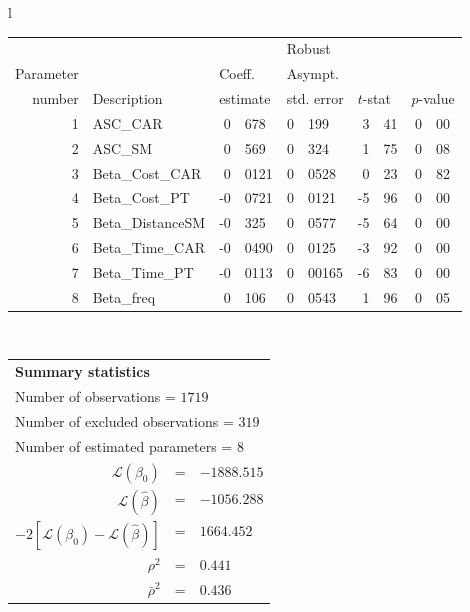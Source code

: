   \begin{tabular}{l}
\begin{tabular}{rlr@{.}lr@{.}lr@{.}lr@{.}l}
         &                       &   \multicolumn{2}{l}{}    & \multicolumn{2}{l}{Robust}  &     \multicolumn{4}{l}{}   \\
Parameter &                       &   \multicolumn{2}{l}{Coeff.}      & \multicolumn{2}{l}{Asympt.}  &     \multicolumn{4}{l}{}   \\
number &  Description                     &   \multicolumn{2}{l}{estimate}      & \multicolumn{2}{l}{std. error}  &   \multicolumn{2}{l}{$t$-stat}  &   \multicolumn{2}{l}{$p$-value}   \\

\hline

1 & ASC_CAR & 0&678 & 0&199 & 3&41 & 0&00\\
2 & ASC_SM & 0&569 & 0&324 & 1&75 & 0&08\\
3 & Beta_Cost_CAR & 0&0121 & 0&0528 & 0&23 & 0&82\\
4 & Beta_Cost_PT & -0&0721 & 0&0121 & -5&96 & 0&00\\
5 & Beta_DistanceSM & -0&325 & 0&0577 & -5&64 & 0&00\\
6 & Beta_Time_CAR & -0&0490 & 0&0125 & -3&92 & 0&00\\
7 & Beta_Time_PT & -0&0113 & 0&00165 & -6&83 & 0&00\\
8 & Beta_freq & 0&106 & 0&0543 & 1&96 & 0&05\\
\hline
\end{tabular}
\\
\begin{tabular}{rcl}
\multicolumn{3}{l}{\bf Summary statistics}\\
\multicolumn{3}{l}{ Number of observations = $1719$} \\
\multicolumn{3}{l}{ Number of excluded observations = $319$} \\
\multicolumn{3}{l}{ Number of estimated  parameters = $8$} \\
 $\mathcal{L}(\beta_0)$ &=&  $-1888.515$ \\
 $\mathcal{L}(\hat{\beta})$ &=& $-1056.288 $  \\
 $-2[\mathcal{L}(\beta_0) -\mathcal{L}(\hat{\beta})]$ &=& $1664.452$ \\
    $\rho^2$ &=&   $0.441$ \\
    $\bar{\rho}^2$ &=&    $0.436$ \\
\end{tabular}
  \end{tabular}
